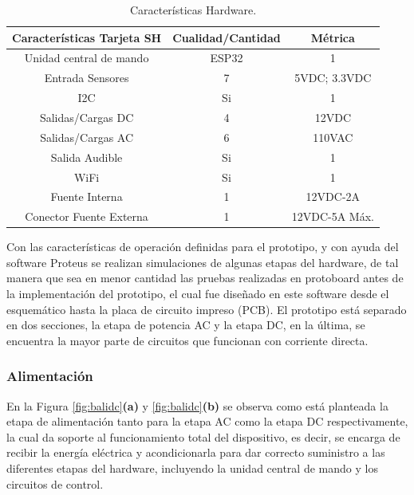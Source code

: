 \begin{table}
	\begin{center}
		\caption{Características Hardware.}
		\label{table:carac}
		\begin{tabular}{|c|c|c|}
			\hline 
			\textbf{Características Tarjeta SH} & \textbf{Cualidad/Cantidad} & \textbf{Métrica} \\ 
			\hline 
			Unidad central de mando & ESP32 & 1\\ 
			\hline 
			Entrada Sensores & 7 & 5VDC; 3.3VDC\\
			\hline 
			I2C & Si & 1\\
			\hline 
			Salidas/Cargas DC & 4 & 12VDC\\
			\hline 
			Salidas/Cargas AC & 6 & 110VAC\\
			\hline 
			Salida Audible & Si & 1\\
			\hline 
			WiFi & Si & 1\\ 
			\hline 
			Fuente Interna & 1 & 12VDC-2A\\
			\hline
			Conector Fuente Externa & 1 & 12VDC-5A Máx.\\
			\hline
		\end{tabular} 
	\end{center}
\end{table}

Con las características de operación definidas para el prototipo, y con ayuda del software Proteus se realizan simulaciones de algunas etapas del hardware, de tal manera que sea en menor cantidad las pruebas realizadas en protoboard antes de la implementación del prototipo, el cual fue diseñado en este software desde el esquemático hasta la placa de circuito impreso (PCB). El prototipo está separado en dos secciones, la etapa de potencia AC y la etapa DC, en la última, se encuentra la mayor parte de circuitos que funcionan con corriente directa.\\

	\subsubsection{Alimentación}
	
	En la Figura \ref{fig:balidc}\textbf{(a)} y \ref{fig:balidc}\textbf{(b)} se observa como está planteada la etapa de alimentación tanto para la etapa AC como la etapa DC respectivamente, la cual da soporte al funcionamiento total del dispositivo, es decir, se encarga de recibir la energía eléctrica y acondicionarla para dar correcto suministro a las diferentes etapas del hardware, incluyendo la unidad central de mando y los circuitos de control.\\
	
